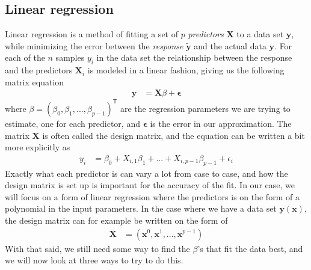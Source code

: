 \documentclass[a4paper]{article}
\newcommand{\XX}{\mathbf{X}}
\newcommand{\T}{\mathsf{T}}
\begin{document}
\subsection{Linear regression} \label{sec:linreg}
Linear regression is a method of fitting a set of $p$ \textit{predictors} $\bm{X}$ to a data set $\bm{y}$, while minimizing the error between the \textit{response} $\bm{\tilde y}$ and the actual data $\bm{y}$. For each of the $n$ samples $y_i$ in the data set the relationship between the response and the predictors $\bm{X}_i$ is modeled in a linear fashion, giving us the following matrix equation
\begin{align*}
	\mathbf{y} &= \XX\beta + \bm{\epsilon}
\end{align*}
where $\beta = (\beta_0, \beta_1, ..., \beta_ {p-1})^\T$ are the regression parameters we are trying to estimate, one for each predictor, and $\bm{\epsilon}$ is the error in our approximation. The matrix $\XX$ is often called the design matrix, and the equation can be written a bit more explicitly as
\begin{align*}
	y_i &= \beta_0 + X_{i,1}\beta_1 + ... + X_{i,p-1}\beta_{p-1} + \epsilon_i
\end{align*}
Exactly what each predictor is can vary a lot from case to case, and how the design matrix is set up is important for the accuracy of the fit. In our case, we will focus on a form of linear regression where the predictors is on the form of a polynomial in the input parameters. In the case where we have a data set $\bm{y}(\bm{x})$, the design matrix can for example be written on the form of
\begin{align*}
	\XX &= (\bm{x}^0, \bm{x}^1, ... , \bm{x}^{p-1})
\end{align*} 
With that said, we still need some way to find the $\beta$'s that fit the data best, and we will now look at three ways to try to do this.
\end{document}
